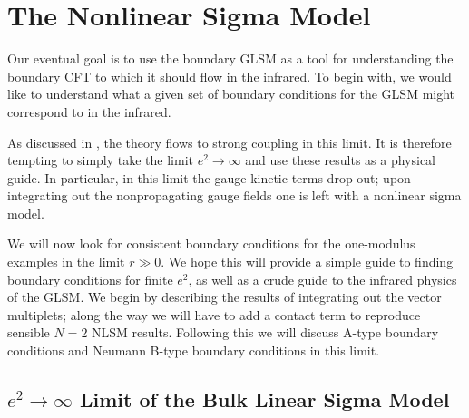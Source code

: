 \documentclass[a4paper,12pt]{article}
\begin{document}
\section{The Nonlinear Sigma Model}

Our eventual goal is to use the boundary GLSM as a tool
for understanding the boundary CFT to which it should flow in the infrared.
To begin with, we would like to understand
what a given set of boundary conditions for the GLSM
might correspond to in the infrared.

As discussed in \cite{wittenphases}, the theory
flows to strong coupling in this limit.  It is therefore
tempting to simply take the limit $e^2 \rightarrow \infty$
and use these results as a physical guide.  In particular,
in this limit the gauge kinetic terms drop out; upon
integrating out the nonpropagating gauge fields one
is left with a nonlinear sigma model.

We will now look for consistent
boundary conditions for the one-modulus examples
in the limit $r \gg 0$.  We hope this will provide 
a simple guide to
finding boundary conditions for finite $e^2$,
as well as a crude guide to the infrared physics of the GLSM.
We begin by describing the results of integrating
out the vector multiplets; along the way we will
have to add a contact term to reproduce sensible
$N=2$ NLSM results.  Following this we will discuss
A-type boundary conditions and Neumann B-type
boundary conditions in this limit.

\subsection{$e^2 \rightarrow \infty$ Limit of the Bulk Linear Sigma Model}
\end{document}
